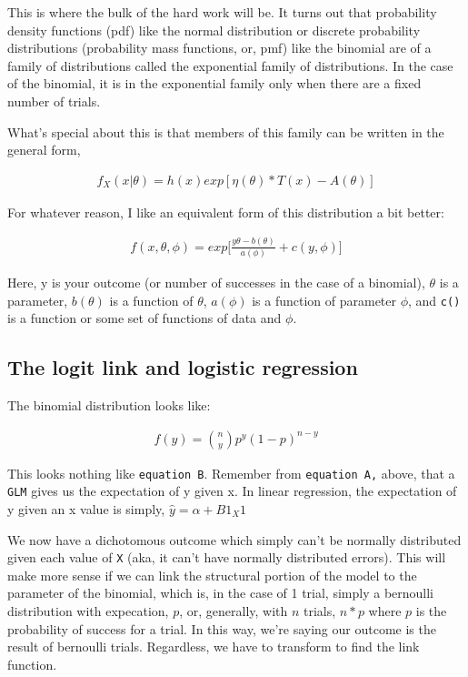 \documentclass[
]{article}
\begin{document}
This is where the bulk of the hard work will be. It turns out that
probability density functions (pdf) like the normal distribution or
discrete probability distributions (probability mass functions, or, pmf)
like the binomial are of a family of distributions called the
exponential family of distributions. In the case of the binomial, it is
in the exponential family only when there are a fixed number of trials.

What's special about this is that members of this family can be written
in the general form,

\begin{align}
\tag{A}
f_X(x|\theta) = h(x)exp[\eta(\theta)*T(x) - A(\theta)]
\end{align}

For whatever reason, I like an equivalent form of this distribution a
bit better:

\begin{align}
\tag{B}
f(x, \theta, \phi) = exp\biggl[\frac{y\theta-b(\theta)}{a(\phi)} + c(y, \phi)\biggr] 
\end{align}

Here, y is your outcome (or number of successes in the case of a
binomial), \(\theta\) is a parameter, \(b(\theta)\) is a function of
\(\theta\), \(a(\phi)\) is a function of parameter \(\phi\), and
\texttt{c()} is a function or some set of functions of data and
\(\phi\).

\hypertarget{the-logit-link-and-logistic-regression}{%
\subsection{The logit link and logistic
regression}\label{the-logit-link-and-logistic-regression}}

The binomial distribution looks like:

\begin{align}
\tag{C}
f(y) = {n \choose y}p^y(1-p)^{n-y}
\end{align}

This looks nothing like \texttt{equation\ B}. Remember from
\texttt{equation\ A,} above, that a \texttt{GLM} gives us the
expectation of y given x. In linear regression, the expectation of y
given an x value is simply, \(\hat{y} = \alpha + B1_X1\)

We now have a dichotomous outcome which simply can't be normally
distributed given each value of \texttt{X} (aka, it can't have normally
distributed errors). This will make more sense if we can link the
structural portion of the model to the parameter of the binomial, which
is, in the case of 1 trial, simply a bernoulli distribution with
expecation, \(p\), or, generally, with \(n\) trials, \(n*p\) where \(p\)
is the probability of success for a trial. In this way, we're saying our
outcome is the result of bernoulli trials. Regardless, we have to
transform to find the link function.
\end{document}
